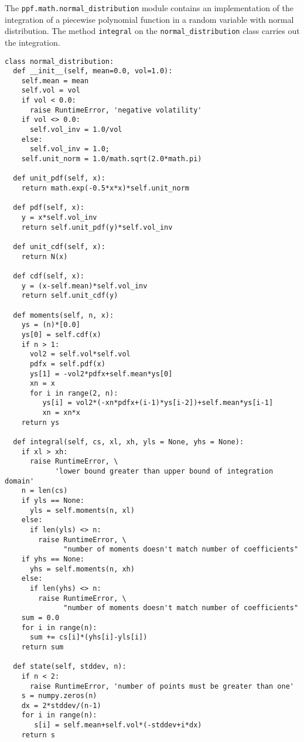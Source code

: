 The \verb|ppf.math.normal_distribution| module contains an implementation of
the integration of a piecewise polynomial function in a random variable 
with normal distribution. The method \verb|integral| on the \verb|normal_distribution| 
class carries out the integration.
\begin{verbatim}
class normal_distribution:
  def __init__(self, mean=0.0, vol=1.0):
    self.mean = mean
    self.vol = vol
    if vol < 0.0:
      raise RuntimeError, 'negative volatility'
    if vol <> 0.0:
      self.vol_inv = 1.0/vol
    else:
      self.vol_inv = 1.0;
    self.unit_norm = 1.0/math.sqrt(2.0*math.pi)

  def unit_pdf(self, x):
    return math.exp(-0.5*x*x)*self.unit_norm
       
  def pdf(self, x):
    y = x*self.vol_inv
    return self.unit_pdf(y)*self.vol_inv
 
  def unit_cdf(self, x):
    return N(x)
    
  def cdf(self, x):
    y = (x-self.mean)*self.vol_inv
    return self.unit_cdf(y)

  def moments(self, n, x):
    ys = (n)*[0.0]
    ys[0] = self.cdf(x)
    if n > 1:
      vol2 = self.vol*self.vol
      pdfx = self.pdf(x)
      ys[1] = -vol2*pdfx+self.mean*ys[0]
      xn = x
      for i in range(2, n):
         ys[i] = vol2*(-xn*pdfx+(i-1)*ys[i-2])+self.mean*ys[i-1]
         xn = xn*x
    return ys
        
  def integral(self, cs, xl, xh, yls = None, yhs = None):
    if xl > xh:
      raise RuntimeError, \
            'lower bound greater than upper bound of integration domain'
    n = len(cs)
    if yls == None:
      yls = self.moments(n, xl)
    else:
      if len(yls) <> n:
        raise RuntimeError, \
              "number of moments doesn't match number of coefficients"
    if yhs == None:
      yhs = self.moments(n, xh)
    else:
      if len(yhs) <> n:
        raise RuntimeError, \
              "number of moments doesn't match number of coefficients"
    sum = 0.0
    for i in range(n):
      sum += cs[i]*(yhs[i]-yls[i])
    return sum

  def state(self, stddev, n):
    if n < 2:
      raise RuntimeError, 'number of points must be greater than one'
    s = numpy.zeros(n)
    dx = 2*stddev/(n-1)
    for i in range(n):
       s[i] = self.mean+self.vol*(-stddev+i*dx)
    return s
\end{verbatim}

